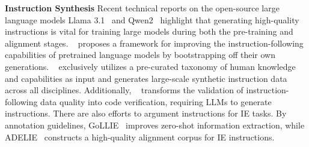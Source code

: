 \noindent \textbf{Instruction Synthesis} 
Recent technical reports on the open-source large language models Llama 3.1~\cite{llama3.1} and Qwen2~\cite{qwen2} highlight that generating high-quality instructions is vital for training large models during both the pre-training and alignment stages. ~\citet{DBLP:Self-Instruct} proposes a framework for improving the instruction-following capabilities of pretrained language models by bootstrapping off their own generations. ~\citet{DBLP:GLAN} exclusively utilizes a pre-curated taxonomy of human knowledge and capabilities as input and generates large-scale synthetic instruction data across all disciplines. Additionally, ~\citet{DBLP:AUTOIF} transforms the validation of instruction-following data quality into code verification, requiring LLMs to generate instructions. There are also efforts to argument instructions for IE tasks. By annotation guidelines, GoLLIE~\cite{DBLP:GoLLIE} improves zero-shot information extraction, while ADELIE~\cite{DBLP:ADELIE} constructs a high-quality alignment corpus for IE instructions.